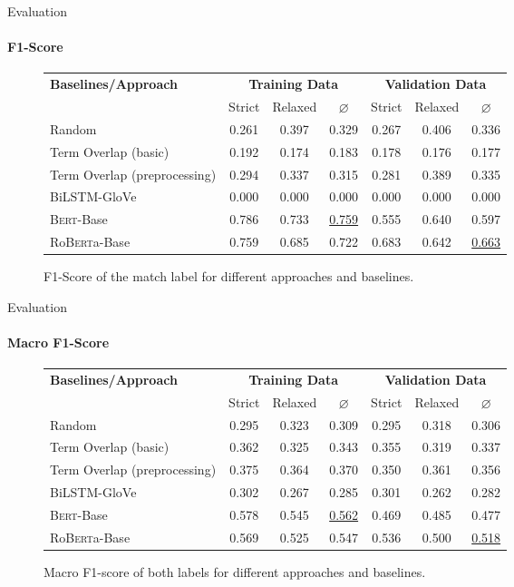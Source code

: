 \documentclass[english,handout]{mlutalk}
\newcommand{\BiLSTM}{\mbox{BiLSTM}\xspace}
\newcommand{\Bert}{\textsc{Bert}\xspace}
\newcommand{\BertBase}{\Bert-Base\xspace}
\newcommand{\Roberta}{\mbox{Ro\textsc{Bert}a}\xspace}
\newcommand{\RobertaBase}{\Roberta-Base\xspace}
\begin{document}
\begin{frame}{Evaluation}
  \framesubtitle{F1-Score}
  \begin{figure}
    \centering
    \caption{F1-Score of the match label for different approaches and baselines.}
    \scriptsize
    \begin{tabular}{lcccccc}
      \toprule
      \textbf{Baselines/Approach} & \multicolumn{3}{c}{\textbf{Training Data}} & \multicolumn{3}{c}{\textbf{Validation Data}} \\
      \cmidrule(r{0.5em}){2-4} \cmidrule(l{0.5em}){5-7}
      & Strict & Relaxed & \(\varnothing\) & Strict & Relaxed & \(\varnothing\) \\
      \midrule
      Random 
      & 0.261 & 0.397 & 0.329 & 0.267 & 0.406 & 0.336 \\
      Term Overlap (basic)
      & 0.192 & 0.174 & 0.183 & 0.178 & 0.176 & 0.177 \\
      Term Overlap (preprocessing)
      & 0.294 & 0.337 & 0.315 & 0.281 & 0.389 & 0.335 \\
      \midrule
      \BiLSTM-GloVe
      & 0.000 & 0.000 & 0.000 & 0.000 & 0.000 & 0.000 \\
      \BertBase
      & 0.786 & 0.733 & \underline{0.759} & 0.555 & 0.640 & 0.597 \\
      \RobertaBase
      & 0.759 & 0.685 & 0.722 & 0.683 & 0.642 & \underline{0.663} \\
      \bottomrule
    \end{tabular}
  \end{figure}
\end{frame}

\begin{frame}{Evaluation}
  \framesubtitle{Macro F1-Score}
  \begin{figure}
    \centering
    \caption{Macro F1-score of both labels for different approaches and baselines.}
    \scriptsize
    \begin{tabular}{lcccccc}
      \toprule
      \textbf{Baselines/Approach} & \multicolumn{3}{c}{\textbf{Training Data}} & \multicolumn{3}{c}{\textbf{Validation Data}} \\
      \cmidrule(r{0.5em}){2-4} \cmidrule(l{0.5em}){5-7}
      & Strict & Relaxed & \(\varnothing\) & Strict & Relaxed & \(\varnothing\) \\
      \midrule
      Random 
      & 0.295 & 0.323 & 0.309 & 0.295 & 0.318 & 0.306 \\
      Term Overlap (basic)
      & 0.362 & 0.325 & 0.343 & 0.355 & 0.319 & 0.337 \\
      Term Overlap (preprocessing)
      & 0.375 & 0.364 & 0.370 & 0.350 & 0.361 & 0.356 \\
      \midrule
      \BiLSTM-GloVe
      & 0.302 & 0.267 & 0.285 & 0.301 & 0.262 & 0.282 \\
      \BertBase
      & 0.578 & 0.545 & \underline{0.562} & 0.469 & 0.485 & 0.477 \\
      \RobertaBase
      & 0.569 & 0.525 & 0.547 & 0.536 & 0.500 & \underline{0.518} \\
      \bottomrule
    \end{tabular}
  \end{figure}
\end{frame}
\end{document}
